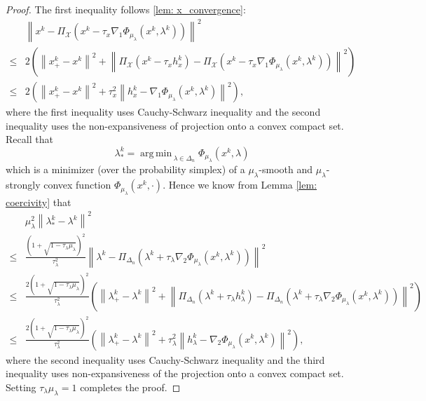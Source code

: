 \documentclass[10pt]{article}
\theoremstyle{remark}
\newcommand{\cX}{\mathcal{X}}
\newcommand{\norm}[1]{\left\|#1\right\|}
\DeclareMathOperator*{\argmin}{arg\,min\,}
\begin{document}
\begin{proof}
    The first inequality follows \eqref{lem: x_convergence}:
    \begin{align*}
        &\norm{x^k - \Pi_{\cX}\left(x^k - \tau_x\nabla_1\Phi_{\mu_{\lambda}}(x^k, \lambda^k)\right)}^2\\
        \leq &2\left(\norm{x_+^k - x^k}^2 + \norm{\Pi_{\cX}\left(x^k - \tau_x h_x^k\right) - \Pi_{\cX}\left(x^k - \tau_x\nabla_1\Phi_{\mu_{\lambda}}(x^k, \lambda^k)\right)}^2\right) \\
        \leq &2\left(\norm{x_+^k - x^k}^2 + \tau_x^2\norm{h_x^k - \nabla_1\Phi_{\mu_{\lambda}}(x^k, \lambda^k) }^2\right),
    \end{align*}
    where the first inequality uses Cauchy-Schwarz inequality and the second inequality uses the non-expansiveness of projection onto a convex compact set. Recall that 
    \[
        \lambda_*^k = \argmin_{\lambda\in\Delta_n} \Phi_{\mu_{\lambda}}(x^k, \lambda)
    \]
    which is a minimizer (over the probability simplex) of a $\mu_{\lambda}$-smooth and $\mu_{\lambda}$-strongly convex function $\Phi_{\mu_{\lambda}}(x^k, \cdot)$. Hence we know from Lemma \ref{lem: coercivity} that
    \begin{align*}
        &\mu_{\lambda}^2\norm{\lambda_*^k - \lambda^k}^2\\
        \leq &\frac{\left(1 + \sqrt{1-\tau_{\lambda}\mu_{\lambda}}\right)^2}{\tau_{\lambda}^2} \norm{\lambda^k - \Pi_{\Delta_n}\left(\lambda^k + \tau_{\lambda}\nabla_2\Phi_{\mu_{\lambda}}(x^k, \lambda^k)\right)}^2\\
        \leq &\frac{2\left(1 + \sqrt{1-\tau_{\lambda}\mu_{\lambda}}\right)^2}{\tau_{\lambda}^2}\left(\norm{\lambda_+^k - \lambda^k}^2 + \norm{\Pi_{\Delta_n}(\lambda^k + \tau_{\lambda}h_{\lambda}^k) - \Pi_{\Delta_n}\left(\lambda^k + \tau_{\lambda}\nabla_2\Phi_{\mu_{\lambda}}(x^k, \lambda^k)\right)}^2\right) \\
        \leq &\frac{2\left(1 + \sqrt{1-\tau_{\lambda}\mu_{\lambda}}\right)^2}{\tau_{\lambda}^2}\left(\norm{\lambda_+^k - \lambda^k}^2 + \tau_{\lambda}^2\norm{h_{\lambda}^k - \nabla_2\Phi_{\mu_{\lambda}}(x^k, \lambda^k)}^2\right),
    \end{align*}
    where the second inequality uses Cauchy-Schwarz inequality and the third inequality uses non-expansiveness of the projection onto a convex compact set. Setting $\tau_{\lambda}\mu_{\lambda}= 1$ completes the proof.
\end{proof}
\end{document}
